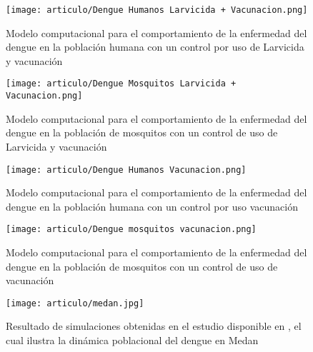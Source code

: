 \documentclass[journal]{IEEEtran}
\begin{document}
\begin{figure}[h]
\texttt{[image: articulo/Dengue Humanos Larvicida + Vacunacion.png]}
\centering 
\caption{Modelo computacional para el comportamiento de la enfermedad del dengue en la población humana con un control por uso de Larvicida y vacunación}
\label{17J}
\end{figure}
\begin{figure}[h]
\texttt{[image: articulo/Dengue Mosquitos Larvicida + Vacunacion.png]}
\centering 
\caption{Modelo computacional para el comportamiento de la enfermedad del dengue en la población de mosquitos con un control de uso de Larvicida y vacunación}
\label{18J}
\end{figure}
\begin{figure}[h]
\texttt{[image: articulo/Dengue Humanos Vacunacion.png]}
\centering 
\caption{Modelo computacional para el comportamiento de la enfermedad del dengue en la población humana con un control por uso vacunación}
\label{19J}
\end{figure}
\begin{figure}[h]
\texttt{[image: articulo/Dengue mosquitos vacunacion.png]}
\centering 
\caption{Modelo computacional para el comportamiento de la enfermedad del dengue en la población de mosquitos con un control de uso de vacunación}
\label{20J}
\end{figure}
\begin{figure}[h]
\texttt{[image: articulo/medan.jpg]}
\centering 
\caption{Resultado de simulaciones obtenidas en el estudio disponible en \cite{medan}, el cual ilustra la dinámica poblacional del dengue en Medan}
\label{1Jo}
\end{figure}
\end{document}
